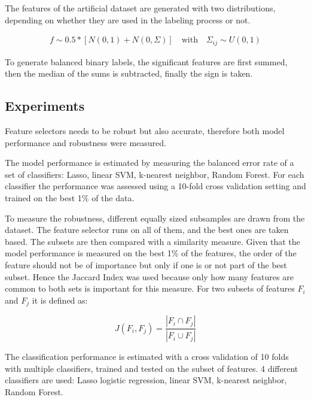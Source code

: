 \documentclass[twoside,11pt]{article}
\begin{document}
The features of the artificial dataset are generated with two distributions, depending on whether they are used in the labeling process or not.

\begin{align}
f \sim0.5 * \left[ N(0, 1) + N(0, \Sigma) \right]  \quad \text{with} \quad \Sigma_{ij} \sim U(0,1)
\end{align}

To generate balanced binary labels, the significant features are first summed, then the median of the sums is subtracted, finally the sign is taken. 





\subsection{Experiments}

Feature selectors needs to be robust but also accurate, therefore both model performance and robustness were measured.

The model performance is estimated by measuring the balanced error rate of a set of classifiers: Lasso, linear SVM, k-nearest neighbor, Random Forest. For each classifier the performance was assessed using a 10-fold cross validation setting and trained on the best 1\% of the data.

To measure the robustness, different equally sized subsamples are drawn from the dataset. The feature selector runs on all of them, and the best ones are taken based. The subsets are then compared with a similarity measure. Given that the model performance is measured on the best 1\% of the features, the order of the feature should not be of importance but only if one is or not part of the best subset. Hence the Jaccard Index was used because only how many features are common to both sets is important for this measure. For two subsets of features $F_i$ and $F_j$ it is defined as:

\begin{equation}
J(F_i, F_j) = \frac{| F_i \cap F_j |}{| F_i \cup F_j |}
\end{equation}

The classification performance is estimated with a cross validation of 10 folds with multiple classifiers, trained and tested on the subset of features. 4 different classifiers are used: Lasso logistic regression, linear SVM, k-nearest neighbor, Random Forest.
\end{document}
